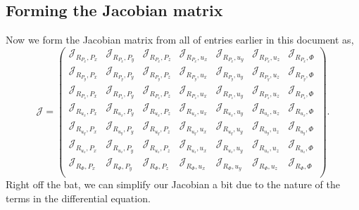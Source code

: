 \documentclass[16pt]{article} %
\begin{document}
\subsection{Forming the Jacobian matrix}
\vspace{-15pt}
Now we form the Jacobian matrix from all of entries earlier in this document as,
\Large
$$ \mathscr{J}  = \begin{pmatrix}
\mathscr{J}_{R_{P_x}, P_x} &\mathscr{J}_{R_{P_x},P_y}&\mathscr{J}_{R_{P_x},P_z} &\mathscr{J}_{R_{P_x}, u_x}& \mathscr{J}_{R_{P_x},u_y} &\mathscr{J}_{R_{P_x},u_z} & \mathscr{J}_{R_{P_x},\Phi}\\
\mathscr{J}_{R_{P_y}, P_x} &\mathscr{J}_{R_{P_y},P_y}&\mathscr{J}_{R_{P_y},P_z} &\mathscr{J}_{R_{P_y}, u_x}& \mathscr{J}_{R_{P_y},u_y} &\mathscr{J}_{R_{P_y},u_z} & \mathscr{J}_{R_{P_y},\Phi}\\
\mathscr{J}_{R_{P_z}, P_x} &\mathscr{J}_{R_{P_z},P_y}&\mathscr{J}_{R_{P_z},P_z} &\mathscr{J}_{R_{P_z}, u_x}& \mathscr{J}_{R_{P_z},u_y} &\mathscr{J}_{R_{P_z},u_z} & \mathscr{J}_{R_{P_z},\Phi}\\
\mathscr{J}_{R_{u_x}, P_x} &\mathscr{J}_{R_{u_x},P_y}&\mathscr{J}_{R_{u_x},P_z} &\mathscr{J}_{R_{u_x}, u_x}& \mathscr{J}_{R_{u_x},u_y} &\mathscr{J}_{R_{u_x},u_z} & \mathscr{J}_{R_{u_x},\Phi}\\
\mathscr{J}_{R_{u_y}, P_x} &\mathscr{J}_{R_{u_y},P_y}&\mathscr{J}_{R_{u_y},P_z} &\mathscr{J}_{R_{u_y}, u_x}& \mathscr{J}_{R_{u_y},u_y} &\mathscr{J}_{R_{u_y},u_z} & \mathscr{J}_{R_{u_y},\Phi}\\
\mathscr{J}_{R_{u_z}, P_x} &\mathscr{J}_{R_{u_z},P_y}&\mathscr{J}_{R_{u_z},P_z} &\mathscr{J}_{R_{u_z}, u_x}& \mathscr{J}_{R_{u_z},u_y} &\mathscr{J}_{R_{u_z},u_z} & \mathscr{J}_{R_{u_z},\Phi}\\
\mathscr{J}_{R_{\Phi}, P_x} &\mathscr{J}_{R_{\Phi},P_y}&\mathscr{J}_{R_{\Phi},P_z} &\mathscr{J}_{R_{\Phi}, u_x}& \mathscr{J}_{R_{\Phi},u_y} &\mathscr{J}_{R_{\Phi},u_z} & \mathscr{J}_{R_{\Phi},\Phi}\\
 \end{pmatrix}. $$
\normalsize
%
%
Right off the bat, we can simplify our Jacobian a bit due to the nature of the terms in the differential equation.
%
\Large
\end{document}
